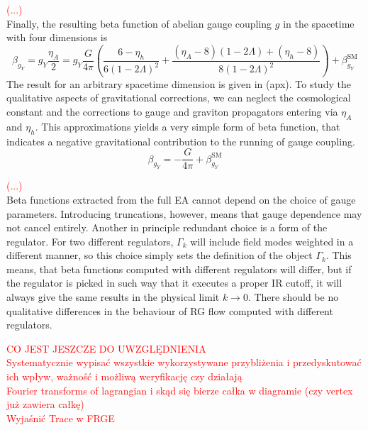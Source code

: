\documentclass[11pt, a4paper]{article}
\begin{document}
\textcolor{red}{(...)}\\

Finally, the resulting beta function of abelian gauge coupling $g$ in the spacetime with four dimensions is
\begin{equation}
    \beta_{g_Y} = g_Y \frac{\eta_A}{2} = g_Y \frac{G}{4 \pi} \left( \frac{6 - \eta_h}{6(1-2 \Lambda)^2} + 
    \frac{(\eta_A-8)(1-2\Lambda) + (\eta_h -8)}{8 (1-2 \Lambda )^2}\right) + \beta_{g_Y}^{\text{SM}}
\end{equation}
The result for an arbitrary spacetime dimension is given in (apx).
To study the qualitative aspects of gravitational corrections, we can neglect the cosmological constant and
the corrections to gauge and graviton propagators entering via $\eta_A$ and $\eta_h$. This approximations
yields a very simple form of beta function, that indicates a negative gravitational contribution to the running
of gauge coupling.
\begin{equation}
    \beta_{g_Y} = - \frac{G}{4 \pi} + \beta_{g_Y}^{\text{SM}}
\end{equation}

\textcolor{red}{(...)}\\

Beta functions extracted from the full EA cannot depend on the choice of gauge parameters.
Introducing truncations, however, means that gauge dependence may not cancel entirely.
Another in principle redundant choice is a form of the regulator. For two different regulators,
$\Gamma_k$ will include field modes weighted in a different manner, so this choice simply
sets the definition of the object $\Gamma_k$. 
This means, that beta functions computed with different regulators will differ, but
if the regulator is picked in such way that it executes a proper IR cutoff,
it will always give the same results in the physical limit $k \rightarrow 0$. There should be no
qualitative differences in the behaviour of RG flow computed with different regulators.

\textcolor{red}{
CO JEST JESZCZE DO UWZGLĘDNIENIA\\
Systematycznie wypisać wszystkie wykorzystywane przybliżenia i przedyskutować ich wpływ, ważność i możliwą weryfikację czy działają\\
Fourier transforms of lagrangian i skąd się bierze całka w diagramie (czy vertex już zawiera całkę)\\
Wyjaśnić Trace w FRGE
}
\end{document}
